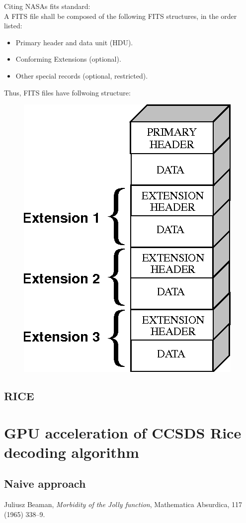 \documentclass[licencjacka,en]{pracamgr}
\begin{document}
Citing NASAs fits standard: \\
A FITS file shall be composed of the following FITS structures,
in the order listed:
\begin{itemize}
	\item Primary header and data unit (HDU).
	\item Conforming Extensions (optional).
	\item Other special records (optional, restricted).
\end{itemize}
Thus, FITS files have follwoing structure:
\begin{figure}[t]
	\centering
	\includegraphics[scale=0.3]{fits}
\end{figure}

\newpage






\section{RICE}

\chapter{GPU acceleration of CCSDS Rice decoding algorithm}\label{r:losers}

\section{Naive approach}







\begin{thebibliography}{99}

	 Juliusz Beaman, \textit{Morbidity of the Jolly
		function}, Mathematica Absurdica, 117 (1965) 338--9.


\end{thebibliography}
\end{document}
